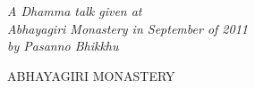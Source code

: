 
\vspace*{3\baselineskip}

{\centering

{\Large\chapterTitleFont\scshape\thetitle}
\vspace*{2\baselineskip}

{\itshape
A Dhamma talk given at\\
Abhayagiri Monastery in September of 2011\\
by Pasanno Bhikkhu}

\vfill

{\large\headFont\color[gray]{0.7}ABHAYAGIRI MONASTERY}

}

